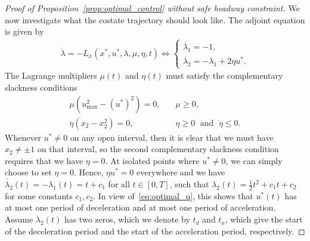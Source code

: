 \documentclass[a4paper]{article}
\theoremstyle{definition}
\theoremstyle{plain}
\begin{document}
\begin{proof}[Proof of Proposition~\ref{prop:optimal_control} without safe
  headway constraint]
We now investigate what the costate trajectory should look like.
The adjoint equation is given by
\begin{align*}
  \dot{\lambda} = - L_{x}(x^{*}, u^{*}, \lambda, \mu, \eta, t) \iff
  \begin{cases}
    \dot{\lambda_{1}} = -1 , \\
    \dot{\lambda_{2}} = - \lambda_{1} + 2 \eta u^{*} .
  \end{cases}
\end{align*}
%
The Lagrange multipliers $\mu(t)$ and $\eta(t)$ must satisfy the complementary slackness conditions
\begin{align*}
  \mu (u_{\max}^{2} - {(u^{*})}^{2}) = 0 ,& \quad \mu \geq 0 , \\
  \eta (x_{2} - x_{2}^{2}) = 0 ,& \quad \eta \geq 0 \; \text{ and } \; \dot{\eta} \leq 0 .
\end{align*}
%
Whenever $u^{*} \neq 0$ on any open interval, then it is clear that we must have
$x_{2} \neq \pm 1$ on that interval, so the second complementary slackness
condition requires that we have $\eta = 0$. At isolated points where
$u^{*} \neq 0$, we can simply choose to set $\eta = 0$. Hence, $\eta u^{*} = 0$
everywhere and we have $\dot{\lambda_{2}}(t) = -\lambda_{1}(t) = t + c_{1}$ for
all $t \in [0, T]$, such that
$\lambda_{2}(t) = \frac{1}{2}t^{2} + c_{1}t + c_{2}$ for some constants
$c_{1}, c_{2}$.
%
In view of~\eqref{eq:optimal_u}, this shows that $u^{*}(t)$ has at most one
period of deceleration and at most one period of acceleration.
%
Assume $\lambda_{2}(t)$ has two zeros, which we denote by $t_{d}$ and $t_{a}$,
which give the start of the deceleration period and the start of the
acceleration period, respectively.


\end{proof}
\end{document}
